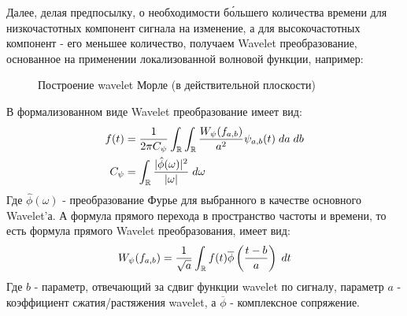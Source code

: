 Далее, делая предпосылку, о необходимости б\'{о}льшего количества времени для низкочастотных компонент сигнала на изменение, а для высокочастотных компонент - его меньшее количество, получаем Wavelet преобразование, основанное на применении локализованной волновой функции, например:
\begin{figure}[H]
	\centering
	\caption{Построение wavelet Морле (в действительной плоскости)}
\end{figure}
В формализованном виде Wavelet преобразование имеет вид:
\begin{equation}
	\begin{split}
		f(t) & = \frac{1}{2\pi C_{\psi}} \int_{\mathbb{R}} \int_{\mathbb{R}} \frac{W_{\psi}(f_{a, b})}{a^2}\psi_{a, b}(t) \; da \; db\\
		C_{\psi} & = \int_{\mathbb{R}} \frac{|\hat{\phi}(\omega)|^2}{|\omega|} \; d \omega
	\end{split}
\end{equation}
Где $\hat{\phi}(\omega)$ - преобразование Фурье для выбранного в качестве основного Wavelet'а. А формула прямого перехода в пространство частоты и времени, то есть формула прямого Wavelet преобразования, имеет вид:
\begin{equation}
	W_{\psi}(f_{a, b}) = \frac{1}{\sqrt{a}}\int_{\mathbb{R}}f(t) \overline{\phi}\left( \frac{t - b}{a} \right) \; dt
\end{equation}
Где $b$ - параметр, отвечающий за сдвиг функции wavelet по сигналу, параметр $a$ - коэффициент сжатия/растяжения wavelet, а $\overline{\phi}$ - комплексное сопряжение.

